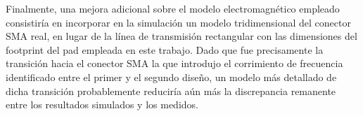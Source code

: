 Finalmente, una mejora adicional sobre el modelo electromagnético empleado consistiría en incorporar en la simulación un modelo tridimensional del conector SMA real, en lugar de la línea de transmisión rectangular con las dimensiones del footprint del pad empleada en este trabajo. Dado que fue precisamente la transición hacia el conector SMA la que introdujo el corrimiento de frecuencia identificado entre el primer y el segundo diseño, un modelo más detallado de dicha transición probablemente reduciría aún más la discrepancia remanente entre los resultados simulados y los medidos.